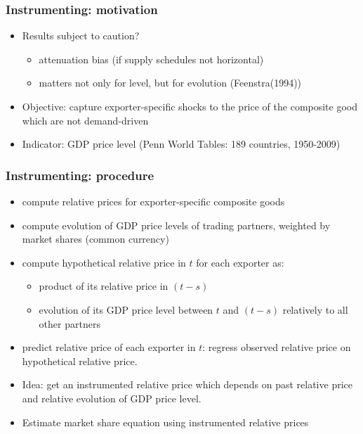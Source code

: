 \documentclass{beamer}
\begin{document}
\begin{frame}[plain]\frametitle{Instrumenting: motivation}
\vspace{0.3cm}
\begin{itemize}
\item Results subject to caution?
\begin{itemize}
\item attenuation bias (if supply schedules not horizontal) 
\item matters not only for level, but for evolution (Feenstra(1994))
\end{itemize}
\vspace{0.3cm}
\item Objective: capture exporter-specific shocks to the price of the composite good which are not demand-driven
\vspace{0.3cm}
\item Indicator: GDP price level (Penn World Tables: 189 countries, 1950-2009)
\end{itemize}
\end{frame}

\begin{frame}[plain]\frametitle{Instrumenting: procedure}
\vspace{0.3cm}
\begin{itemize}
\item compute relative prices for exporter-specific composite goods 
\item compute evolution of GDP price levels of trading partners, weighted by market shares (common currency)
\item compute hypothetical relative price in $t$ for each exporter as:
\begin{itemize}
\item product of its relative price in $(t-s)$
\item evolution of its GDP price level between $t$ and $(t-s)$ relatively to all other partners
\end{itemize}
\item predict relative price of each exporter in $t$: regress observed relative price on hypothetical relative price.
\item Idea: get an instrumented relative price which depends on past relative price and relative evolution of GDP price level.
\item Estimate market share equation using instrumented relative prices
\end{itemize}
\end{frame}
\end{document}
